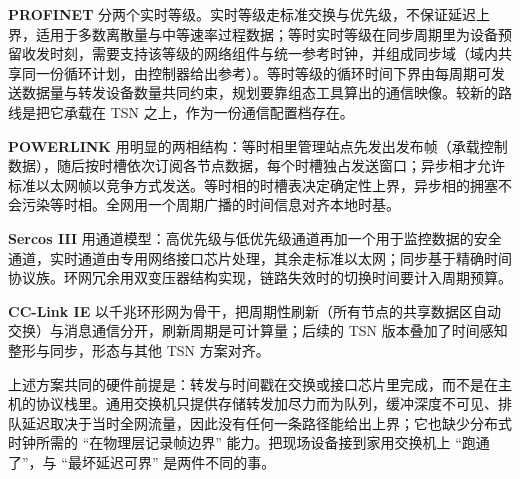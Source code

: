 \documentclass[12pt,a4paper,fontset=fandol]{ctexbook}
\begin{document}
\textbf{PROFINET} 分两个实时等级。实时等级走标准交换与优先级，不保证延迟上界，适用于多数离散量与中等速率过程数据；等时实时等级在同步周期里为设备预留收发时刻，需要支持该等级的网络组件与统一参考时钟，并组成同步域（域内共享同一份循环计划，由控制器给出参考）。等时等级的循环时间下界由每周期可发送数据量与转发设备数量共同约束，规划要靠组态工具算出的通信映像。较新的路线是把它承载在 TSN 之上，作为一份通信配置档存在。

\textbf{POWERLINK} 用明显的两相结构：等时相里管理站点先发出发布帧（承载控制数据），随后按时槽依次订阅各节点数据，每个时槽独占发送窗口；异步相才允许标准以太网帧以竞争方式发送。等时相的时槽表决定确定性上界，异步相的拥塞不会污染等时相。全网用一个周期广播的时间信息对齐本地时基。

\textbf{Sercos III} 用通道模型：高优先级与低优先级通道再加一个用于监控数据的安全通道，实时通道由专用网络接口芯片处理，其余走标准以太网；同步基于精确时间协议族。环网冗余用双变压器结构实现，链路失效时的切换时间要计入周期预算。

\textbf{CC-Link IE} 以千兆环形网为骨干，把周期性刷新（所有节点的共享数据区自动交换）与消息通信分开，刷新周期是可计算量；后续的 TSN 版本叠加了时间感知整形与同步，形态与其他 TSN 方案对齐。

\begin{note}[title={为什么通用交换机做不到工业实时}]
上述方案共同的硬件前提是：转发与时间戳在交换或接口芯片里完成，而不是在主机的协议栈里。通用交换机只提供存储转发加尽力而为队列，缓冲深度不可见、排队延迟取决于当时全网流量，因此没有任何一条路径能给出上界；它也缺少分布式时钟所需的 ``在物理层记录帧边界'' 能力。把现场设备接到家用交换机上 ``跑通了''，与 ``最坏延迟可界'' 是两件不同的事。
\end{note}
\end{document}
